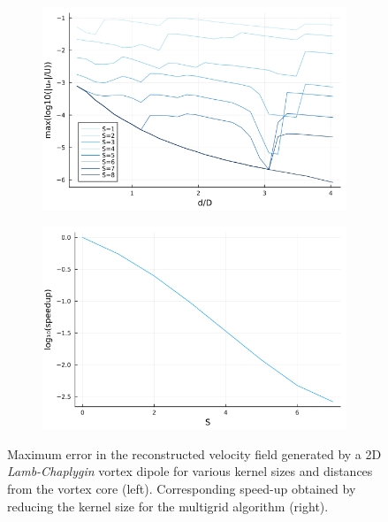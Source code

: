 \documentclass[preprint,12pt]{elsarticle}
\begin{document}
\begin{figure}
    \centering
    \begin{subfigure}{.5\textwidth}
        \centering
        \includegraphics[width=\textwidth]{tex//fig/lamb_dipole_error_dists.png}
    \end{subfigure}%
    \begin{subfigure}{.5\textwidth}
        \centering
        \includegraphics[width=\textwidth]{tex/fig/lamb_dipole_speedup_dists.png}
    \end{subfigure}
    \caption{Maximum error in the reconstructed velocity field generated by a 2D \emph{Lamb-Chaplygin} vortex dipole for various kernel sizes and distances from the vortex core (left). Corresponding speed-up obtained by reducing the kernel size for the multigrid algorithm (right).}
    \label{fig:error_lamb_2}
\end{figure}
\end{document}
